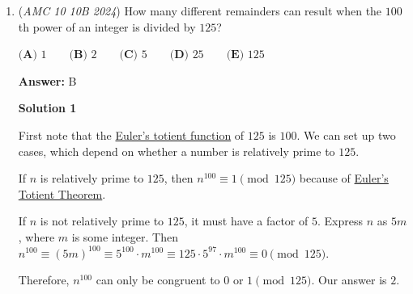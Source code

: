 \begin{enumerate}
 If $k=3$ \textbf{maxima tie} exist, then note that if a tie is held between $A,B,C$, it is the same for the other 5 iterations. Out of one iteration, 5 other copies exist that yield the same result, meaning our cases for the \textbf{maxima tie} are $\frac{5 \cdot 4 \cdot 3}{6} = 10$. Then, the word rearrangement for $\mathcal{M}DE$ is $3! = 6$, yielding 60 cases.

 If $k=4$ \textbf{maxima tie} exist, then every partition of $A,B,C,D$ yields 23 other copies, meaning there are 5 acknowledgeable cases. Then the word rearrangement for $\mathcal{M}E$ is $2! = 2$, yielding 10 cases.

 If $k=5$ \textbf{maxima tie} exist, then every partition of $A,B,C,D,E$ yields 119 other copies, meaning there is only one acknowledgeable case. Then, the word rearrangement for $\mathcal{M}$ is $1! = 1$ yielding 1 case.

 The desired answer is then

 
 \[120 + \sum_{T = k \neq {1} \in S_{T}} \textbf{maxima tie plausible cases}\]
 \[120 + 240 + 60 + 10 + 1 = \boxed{431}\]



	\item (\textit{AMC 10 10B 2024}) How many different remainders can result when the $100$th power of an integer is
divided by $125$?


 $\textbf{(A) } 1 \qquad\textbf{(B) } 2 \qquad\textbf{(C) } 5 \qquad\textbf{(D) } 25 \qquad\textbf{(E) } 125$

 \textbf{Answer: }B



\textbf{Solution 1}

First note that the \href{https://artofproblemsolving.com/wiki/index.php?title=Euler\%27s\_totient\_function}{Euler's totient function} of $125$ is $100$. We can set up two cases, which depend on whether a number is relatively prime to $125.$

 If $n$ is relatively prime to $125$, then $n^{100} \equiv 1 \pmod{125}$ because of \href{https://artofproblemsolving.com/wiki/index.php?title=Euler\%27s\_Totient\_Theorem}{Euler's Totient Theorem}. 

 If $n$ is not relatively prime to $125$, it must have a factor of $5$. Express $n$ as $5m$, where $m$ is some integer. Then $n^{100} \equiv (5m)^{100} \equiv 5^{100}\cdot m^{100} \equiv 125 \cdot 5^{97} \cdot m^{100} \equiv 0 \pmod{125}$.

 Therefore, $n^{100}$ can only be congruent to $0$ or $1 \pmod{125}$. Our answer is $\boxed{2}$.


\end{enumerate}
